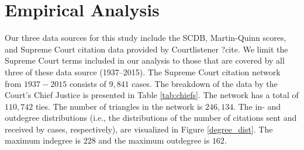 \documentclass[headsepline=true, abstracton]{scrartcl}
\begin{document}





 \section{Empirical Analysis}
Our three data sources for this study include the SCDB, Martin-Quinn scores, and Supreme Court citation data provided by Courtlistener ?cite. We limit the Supreme Court terms included in our analysis to those that are covered by all three of these data source (1937--2015).  The Supreme Court citation network from $1937 - 2015$ consists of $9,841$ cases. The breakdown of the data by the Court's Chief Justice is presented in Table \ref{tab:chiefs}. The network has a total of $110,742$ ties. The number of triangles in the network is $246,134$. The in- and outdegree distributions (i.e., the distributions of the number of citations sent and received by cases, respectively), are visualized in Figure \ref{degree_dist}. The maximum indegree is $228$ and the maximum outdegree is $162$.
\end{document}
